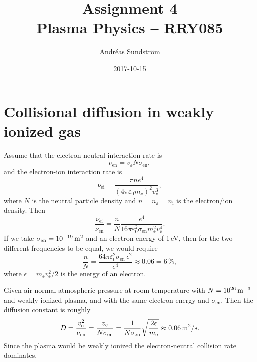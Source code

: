 \documentclass[11pt,a4paper, 
swedish, english %
]{article}
\begin{document}


\title{Assignment 4 \\
{\Large Plasma Physics -- RRY085}}
\author{Andréas Sundström}
\date{2017-10-15}

\maketitle


\section{Collisional diffusion in weakly ionized gas}
Assume that the electron-neutral interaction rate is
\begin{equation}
\nu_{\text{en}}=v_\ee N \sigma_\text{en},
\end{equation}
and the electron-ion interaction rate is
\begin{equation}
\nu_\text{ei}=\frac{\pi n e^4}{(4\pi\varepsilon_0 m_\ee)^2v_\ee^3},
\end{equation}
where $N$ is the neutral particle density and $n=n_\ee=n_\text{i}$ is
the electron/ion density. Then
\begin{equation}
\frac{\nu_\text{ei}}{\nu_{\text{en}}}
=\frac{n}{N}\frac{e^4}
{16\pi\varepsilon_0^2\sigma_\text{en}m_\ee^2 v_\ee^4}.
\end{equation}
If we take $\sigma_\text{en}=\unit[10^{-19}]{m^2}$ and an electron
energy of 1\,eV, then for the two different frequencies to be equal,
we would require 
\begin{equation}
\frac{n}{N}=
\frac{64\pi\varepsilon_0^2
\sigma_\text{en}\,\epsilon^2}{e^4}
\approx 0.06 = 6\,\%,
\end{equation}
where $\epsilon =m_\ee v_\ee^2/2$ is the energy of an electron.

Given air normal atmospheric pressure at room temperature with
$N=\unit[10^{26}]{m^{-3}}$ and weakly ionized plasma, and with the
same electron energy and $\sigma_\text{en}$. Then the diffusion
constant is roughly 
\begin{equation}
D=\frac{v_\ee^2}{\nu_\text{en}}
=\frac{v_\ee}{N\sigma_\text{en}}
=\frac{1}{N\sigma_\text{en}}\sqrt{\frac{2\epsilon}{m_\ee}}
\approx \unit[0.06]{m^2/s}.
\end{equation}
Since the plasma would be weakly ionized the electron-neutral
collision rate dominates. 
\end{document}
